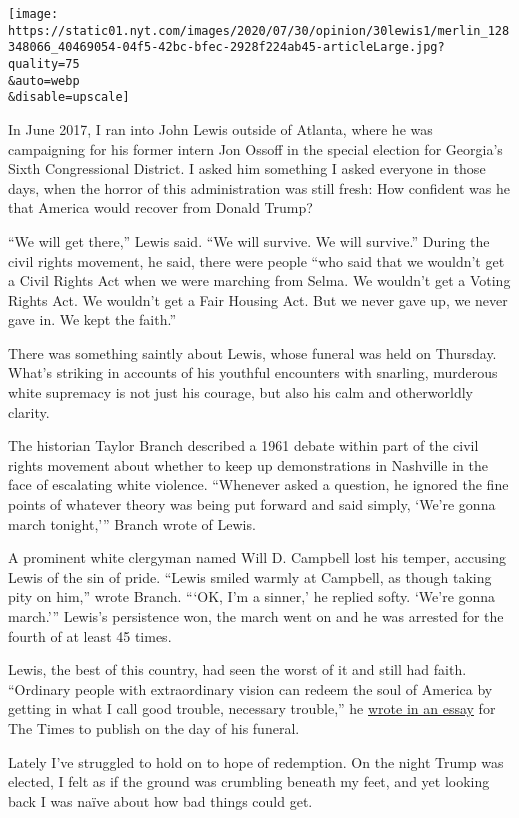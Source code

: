 \texttt{[image: https://static01.nyt.com/images/2020/07/30/opinion/30lewis1/merlin\_128348066\_40469054-04f5-42bc-bfec-2928f224ab45-articleLarge.jpg?quality=75\\\&auto=webp\\\&disable=upscale]}

In June 2017, I ran into John Lewis outside of Atlanta, where he was
campaigning for his former intern Jon Ossoff in the special election for
Georgia's Sixth Congressional District. I asked him something I asked
everyone in those days, when the horror of this administration was still
fresh: How confident was he that America would recover from Donald
Trump?

``We will get there,'' Lewis said. ``We will survive. We will survive.''
During the civil rights movement, he said, there were people ``who said
that we wouldn't get a Civil Rights Act when we were marching from
Selma. We wouldn't get a Voting Rights Act. We wouldn't get a Fair
Housing Act. But we never gave up, we never gave in. We kept the
faith.''

There was something saintly about Lewis, whose funeral was held on
Thursday. What's striking in accounts of his youthful encounters with
snarling, murderous white supremacy is not just his courage, but also
his calm and otherworldly clarity.

The historian Taylor Branch described a 1961 debate within part of the
civil rights movement about whether to keep up demonstrations in
Nashville in the face of escalating white violence. ``Whenever asked a
question, he ignored the fine points of whatever theory was being put
forward and said simply, `We're gonna march tonight,''' Branch wrote of
Lewis.

A prominent white clergyman named Will D. Campbell lost his temper,
accusing Lewis of the sin of pride. ``Lewis smiled warmly at Campbell,
as though taking pity on him,'' wrote Branch. ```OK, I'm a sinner,' he
replied softy. `We're gonna march.''' Lewis's persistence won, the march
went on and he was arrested for the fourth of at least 45 times.

Lewis, the best of this country, had seen the worst of it and still had
faith. ``Ordinary people with extraordinary vision can redeem the soul
of America by getting in what I call good trouble, necessary trouble,''
he
\href{https://www.nytimes.com/2020/07/30/opinion/john-lewis-civil-rights-america.html}{wrote
in an essay} for The Times to publish on the day of his funeral.

Lately I've struggled to hold on to hope of redemption. On the night
Trump was elected, I felt as if the ground was crumbling beneath my
feet, and yet looking back I was naïve about how bad things could get.

